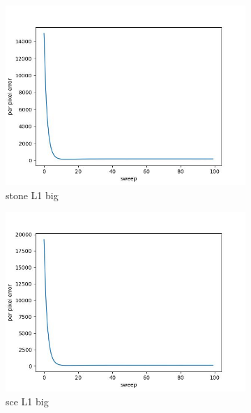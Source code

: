 \documentclass[11pt]{article}
\begin{document}
\begin{figure}[ht!]
    \centering
    \hfill%
    \begin{subfigure}[]{0.333\linewidth}
        \centering
        \includegraphics[width=\linewidth]{fig/loss/stone_L1_big_loss.jpg}
        \caption{stone L1 big}
    \end{subfigure}%
    \hfill%
    \begin{subfigure}[]{0.333\linewidth}
        \centering
        \includegraphics[width=\linewidth]{fig/loss/sce_L1_big_loss.jpg}
        \caption{sce L1 big}
    \end{subfigure}%
    \hfill%
    \begin{subfigure}[]{0.333\linewidth}
        \centering

\end{subfigure}
\end{figure}
\end{document}
